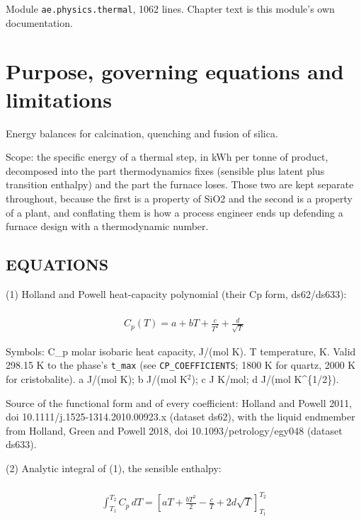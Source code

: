 \documentclass[10pt,a4paper,twoside]{report}
\begin{document}

{\footnotesize\color{slate}Module \texttt{ae.physics.thermal}, 1062 lines. Chapter text is this module's own documentation.\par}

\section{Purpose, governing equations and limitations}

Energy balances for calcination, quenching and fusion of silica.

Scope: the specific energy of a thermal step, in kWh per tonne of product, decomposed into the part thermodynamics fixes (sensible plus latent plus transition enthalpy) and the part the furnace loses. Those two are kept separate throughout, because the first is a property of SiO2 and the second is a property of a plant, and conflating them is how a process engineer ends up defending a furnace design with a thermodynamic number.

\subsection*{EQUATIONS}

(1) Holland and Powell heat-capacity polynomial (their Cp form, ds62/ds633):

\begin{equation*}
\begin{gathered}
\\ C_p(T) = a + bT + \frac{c}{T^2} + \frac{d}{\sqrt{T}}
\end{gathered}
\end{equation*}

Symbols: C\_p   molar isobaric heat capacity, J/(mol K). T     temperature, K. Valid 298.15 K to the phase's \texttt{t\_max} (see \texttt{CP\_COEFFICIENTS}; 1800 K for quartz, 2000 K for cristobalite). a     J/(mol K); b J/(mol K$^{2}$); c J K/mol; d J/(mol K\textasciicircum{}\{1/2\}).

Source of the functional form and of every coefficient: Holland and Powell 2011, doi 10.1111/j.1525-1314.2010.00923.x (dataset ds62), with the liquid endmember from Holland, Green and Powell 2018, doi 10.1093/petrology/egy048 (dataset ds633).

(2) Analytic integral of (1), the sensible enthalpy:

\begin{equation*}
\begin{gathered}
\\ \int_{T_1}^{T_2} C_p\,dT = \left[aT + \frac{b T^2}{2} - \frac{c}{T} + 2d\sqrt{T}\right]_{T_1}^{T_2}
\end{gathered}
\end{equation*}
\end{document}
